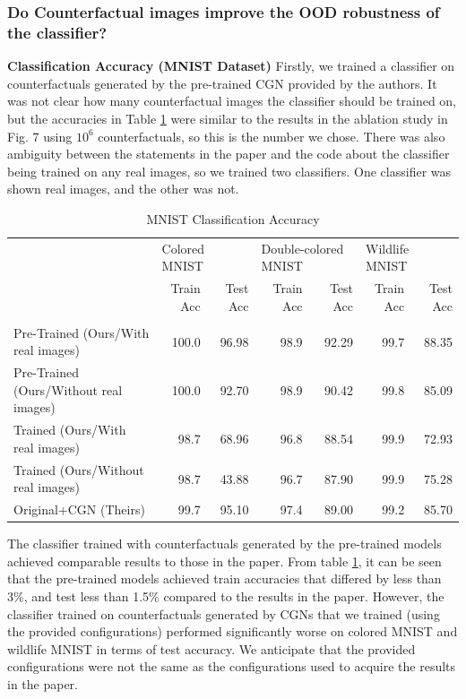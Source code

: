\subsubsection{Do Counterfactual images improve the OOD robustness of the classifier?}
\textbf{Classification Accuracy (MNIST Dataset)}
Firstly, we trained a classifier on counterfactuals generated by the pre-trained CGN provided by the authors. It was not clear how many counterfactual images the classifier should be trained on, but the accuracies in Table \ref{table:mnist-classification} were similar to the results in the ablation study in Fig. 7 using $10^6$ counterfactuals, so this is the number we chose. There was also ambiguity between the statements in the paper and the code about the classifier being trained on any real images, so we trained two classifiers. One classifier was shown real images, and the other was not. 
\\
\begin{table}[h]
\centering
\begin{tabular}{lrrrrrr}
\toprule
{} & \multicolumn{2}{l}{Colored MNIST} & \multicolumn{2}{l}{Double-colored MNIST} & \multicolumn{2}{l}{Wildlife MNIST} \\
{} &     Train Acc & Test Acc &            Train Acc & Test Acc &      Train Acc & Test Acc \\
                                       &               &          &                      &          &                &          \\
\midrule
Pre-Trained (Ours/With real images)    &         100.0 &    96.98 &                 98.9 &    92.29 &           99.7 &    88.35 \\
Pre-Trained (Ours/Without real images) &         100.0 &    92.70 &                 98.9 &    90.42 &           99.8 &    85.09 \\
Trained (Ours/With real images)        &          98.7 &    68.96 &                 96.8 &    88.54 &           99.9 &    72.93 \\
Trained (Ours/Without real images)     &          98.7 &    43.88 &                 96.7 &    87.90 &           99.9 &    75.28 \\
Original+CGN (Theirs)                               &          99.7 &    95.10 &                 97.4 &    89.00 &           99.2 &    85.70 \\
\bottomrule
\end{tabular}
\caption {MNIST Classification Accuracy}
\label{table:mnist-classification}
\end{table}
The classifier trained with counterfactuals generated by the pre-trained models achieved comparable results to those in the paper. From table \ref{table:mnist-classification}, it can be seen that the pre-trained models achieved train accuracies that differed by less than 3\%, and test less than 1.5\% compared to the results in the paper. However, the classifier trained on counterfactuals generated by CGNs that we trained (using the provided configurations) performed significantly worse on colored MNIST and wildlife MNIST in terms of test accuracy. We anticipate that the provided configurations were not the same as the configurations used to acquire the results in the paper. 



